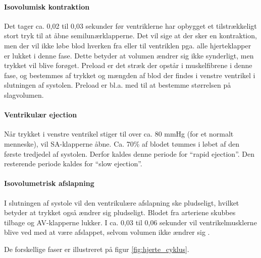 \paragraph*{Isovolumisk kontraktion}
Det tager ca. 0,02 til 0,03 sekunder før ventriklerne har opbygget et tilstrækkeligt stort tryk til at åbne semilunærklapperne. Det vil sige at der sker en kontraktion, men der vil ikke løbe blod hverken fra eller til ventriklen pga. alle hjerteklapper er lukket i denne fase. Dette betyder at volumen ændrer sig ikke synderligt, men trykket vil blive forøget. Preload er det stræk der opstår i muskelfibrene i denne fase, og bestemmes af trykket og mængden af blod der findes i venstre ventrikel i slutningen af systolen. Preload er bl.a. med til at bestemme størrelsen på slagvolumen.

\paragraph*{Ventrikulær ejection}
Når trykket i venstre ventrikel stiger til over ca. 80 mmHg (for et normalt menneske), vil SA-klapperne åbne. Ca. 70\% af blodet tømmes i løbet af den første tredjedel af systolen. Derfor kaldes denne periode for “rapid ejection”. Den resterende periode kaldes for “slow ejection”.

\paragraph*{Isovolumetrisk afslapning}
I slutningen af systole vil den ventrikulære afslapning ske pludseligt, hvilket betyder at trykket også ændrer sig pludseligt. Blodet fra arteriene skubbes tilbage og AV-klapperne lukker. I ca. 0,03 til 0,06 sekunder vil ventrikelmusklerne blive ved med at være  afslappet, selvom volumen ikke ændrer sig \cite{guyton} \cite{cindy} \cite{gronanatomi}. 

\noindent De forskellige faser er illustreret på figur \ref{fig:hjerte_cyklus}.\\


